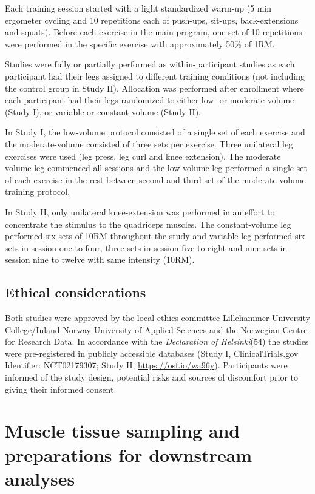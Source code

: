 \documentclass[twoside,10pt]{gihclass} %
\begin{document}
Each training session started with a light standardized warm-up (5 min ergometer cycling and 10 repetitions each of push-ups, sit-ups, back-extensions and squats). Before each exercise in the main program, one set of 10 repetitions were performed in the specific exercise with approximately 50\% of 1RM.

Studies were fully or partially performed as within-participant studies as each participant had their legs assigned to different training conditions (not including the control group in Study II). Allocation was performed after enrollment where each participant had their legs randomized to either low- or moderate volume (Study I), or variable or constant volume (Study II).

In Study I, the low-volume protocol consisted of a single set of each exercise and the moderate-volume consisted of three sets per exercise. Three unilateral leg exercises were used (leg press, leg curl and knee extension). The moderate volume-leg commenced all sessions and the low volume-leg performed a single set of each exercise in the rest between second and third set of the moderate volume training protocol.

In Study II, only unilateral knee-extension was performed in an effort to concentrate the stimulus to the quadriceps muscles. The constant-volume leg performed six sets of 10RM throughout the study and variable leg performed six sets in session one to four, three sets in session five to eight and nine sets in session nine to twelve with same intensity (10RM).

\hypertarget{ethical-considerations}{%
\subsection{Ethical considerations}\label{ethical-considerations}}

Both studies were approved by the local ethics committee Lillehammer University College/Inland Norway University of Applied Sciences and the Norwegian Centre for Research Data. In accordance with the \emph{Declaration of Helsinki}(54) the studies were pre-registered in publicly accessible databases (Study I, ClinicalTrials.gov Identifier: NCT02179307; Study II, \url{https://osf.io/wa96y}). Participants were informed of the study design, potential risks and sources of discomfort prior to giving their informed consent.

\hypertarget{muscle-tissue-sampling-and-preparations-for-downstream-analyses}{%
\section{Muscle tissue sampling and preparations for downstream analyses}\label{muscle-tissue-sampling-and-preparations-for-downstream-analyses}}
\end{document}
